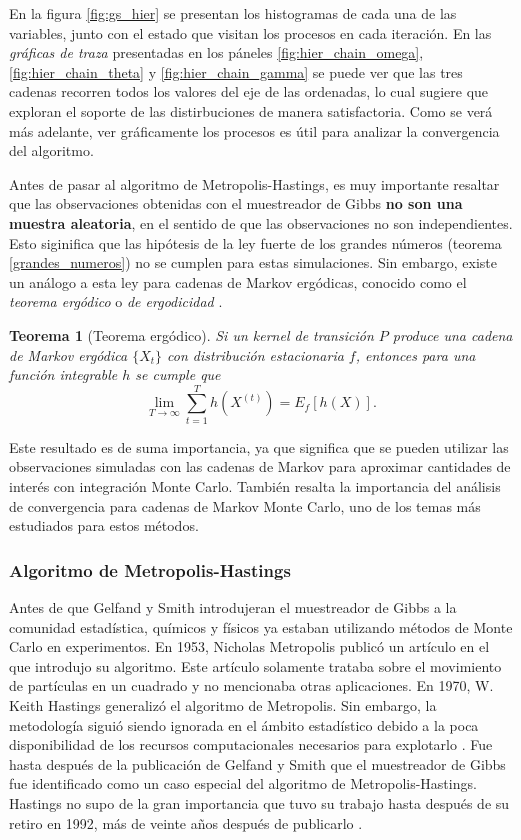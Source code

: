 \documentclass[11pt,a4paper]{article}
\newtheorem{theorem}{Teorema}[section]
\begin{document}
En la figura \ref{fig:gs_hier} se presentan los histogramas de cada una de las variables, junto con el estado que visitan los procesos en cada iteración. En las \textit{gráficas de traza} presentadas en los páneles \ref{fig:hier_chain_omega}, \ref{fig:hier_chain_theta} y \ref{fig:hier_chain_gamma} se puede ver que las tres cadenas recorren todos los valores del eje de las ordenadas, lo cual sugiere que exploran el soporte de las distirbuciones de manera satisfactoria. Como se verá más adelante, ver gráficamente los procesos es útil para analizar la convergencia del algoritmo.

Antes de pasar al algoritmo de Metropolis-Hastings, es muy importante resaltar que las observaciones obtenidas con el muestreador de Gibbs \textbf{no son una muestra aleatoria}, en el sentido de que las observaciones no son independientes. Esto siginifica que las hipótesis de la ley fuerte de los grandes números (teorema \ref{grandes_numeros}) no se cumplen para estas simulaciones. Sin embargo, existe un análogo a esta ley para cadenas de Markov ergódicas, conocido como el \textit{teorema ergódico} o \textit{de ergodicidad} \citep{casella}.

\begin{theorem}[Teorema ergódico]
Si un kernel de transición $P$ produce una cadena de Markov ergódica $\lbrace X_t \rbrace$ con distribución estacionaria $f$, entonces para una función integrable $h$ se cumple que
\begin{equation}
\lim_{T \to \infty} \sum_{t = 1}^T h(X^{(t)}) = E_f[h(X)].
\end{equation}
\end{theorem}


Este resultado es de suma importancia, ya que significa que se pueden utilizar las observaciones simuladas con las cadenas de Markov para aproximar cantidades de interés con integración Monte Carlo. También resalta la importancia del análisis de convergencia para cadenas de Markov Monte Carlo, uno de los temas más estudiados para estos métodos.

\subsubsection*{Algoritmo de Metropolis-Hastings}
\label{sec:mh}

Antes de que Gelfand y Smith introdujeran el muestreador de Gibbs a la comunidad estadística, químicos y físicos ya estaban utilizando métodos de Monte Carlo en experimentos. En 1953, Nicholas Metropolis publicó un artículo en el que introdujo su algoritmo. Este artículo solamente trataba sobre el movimiento de partículas en un cuadrado y no mencionaba otras aplicaciones. En 1970, W. Keith Hastings generalizó el algoritmo de Metropolis. Sin embargo, la metodología siguió siendo ignorada en el ámbito estadístico debido a la poca disponibilidad de los recursos computacionales necesarios para explotarlo \citep{bertsch}. Fue hasta después de la publicación de Gelfand y Smith que el muestreador de Gibbs fue identificado como un caso especial del algoritmo de Metropolis-Hastings. Hastings no supo de la gran importancia que tuvo su trabajo hasta después de su retiro en 1992, más de veinte años después de publicarlo \citep{bertsch}.
\end{document}
